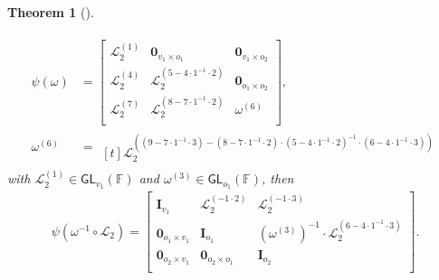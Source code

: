 \documentclass[12pt, a4paper, oneside]{memoir}
\newtheorem{theorem}{Theorem}[section]
\theoremstyle{definition}
\begin{document}
\begin{theorem}[{\cite[Thm.~3.6]{Petzoldt:201307}}]
\begin{enumerate}
    \begin{align}
      \begin{split}
        \psi(\omega) &=
        \begin{bmatrix}
          \mathcal{L}_{2}^{(1)} & \mathbf{0}_{v_{1} \times o_{1}} & \mathbf{0}_{v_{1} \times o_{2}} \\
          \mathcal{L}_{2}^{(4)} & \mathcal{L}_{2}^{(5 - 4 \cdot 1^{-1} \cdot 2)} & \mathbf{0}_{o_{1} \times o_{2}} \\
          \mathcal{L}_{2}^{(7)} & \mathcal{L}_{2}^{(8 - 7 \cdot 1^{-1} \cdot 2)} & \omega^{(6)} \\
        \end{bmatrix}, \\
        \omega^{(6)} &=
        \begin{multlined}[t]
          \mathcal{L}_{2}^{((9 - 7 \cdot 1^{-1} \cdot 3) -(8 - 7 \cdot 1^{-1} \cdot 2) \cdot (5 - 4 \cdot 1^{-1} \cdot 2)^{-1} \cdot (6 - 4 \cdot 1^{-1} \cdot 3))}
        \end{multlined}
      \end{split}
    \end{align}
    with $\mathcal{L}_{2}^{(1)} \in \mathsf{GL}_{v_{1}}(\mathbb{F})$ and $\omega^{(3)} \in \mathsf{GL}_{o_{1}}(\mathbb{F})$, then
    \begin{align}
      \psi(\omega^{-1} \circ \mathcal{L}_{2}) =
      \begin{bmatrix}
        \mathbf{I}_{v_{1}} & \mathcal{L}_{2}^{(-1 \cdot 2)} & \mathcal{L}_{2}^{(-1 \cdot 3)} \\
        \mathbf{0}_{o_{1} \times v_{1}} & \mathbf{I}_{o_{1}} & (\omega^{(3)})^{-1} \cdot \mathcal{L}_{2}^{(6 - 4 \cdot 1^{-1} \cdot 3)} \\
        \mathbf{0}_{o_{2} \times v_{1}} & \mathbf{0}_{o_{2} \times o_{1}} & \mathbf{I}_{o_{2}} \\
      \end{bmatrix}.
    \end{align}
  \end{enumerate}
\end{theorem}
\end{document}
